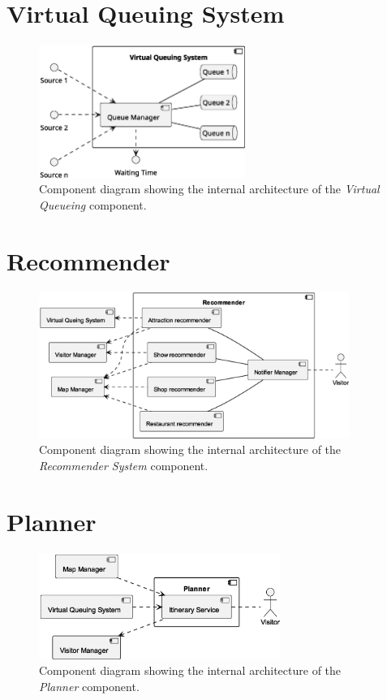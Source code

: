 \section{Virtual Queuing System}
\begin{figure}[H]
	\centering
	\includegraphics[width=0.6\textwidth]{img/virtual-queuing.eps}
	\caption{Component diagram showing the internal architecture of the \textit{Virtual Queueing} component.
	}
	\label{fig:virtual-queueing-arch}
\end{figure}

\section{Recommender}

\begin{figure}[H]
	\centering
	\includegraphics[width=0.9\textwidth]{img/recommender.eps}
	\caption{Component diagram showing the internal architecture of the \textit{Recommender System} component.
	}
	\label{fig:recommender-arch}
\end{figure}

\section{Planner}

\begin{figure}[H]
	\centering
	\includegraphics[width=0.7\textwidth]{img/planner.eps}
	\caption{Component diagram showing the internal architecture of the \textit{Planner} component.
	}
	\label{fig:planner-arch}
\end{figure}

